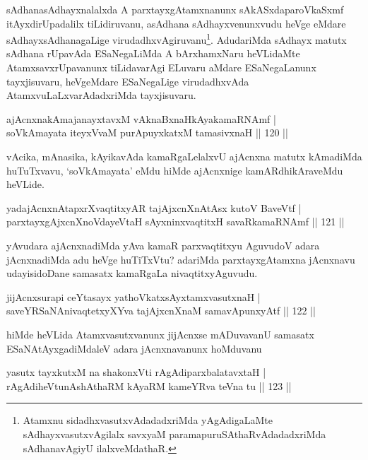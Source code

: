 \begin{artha}
sAdhanasAdhayxnalalxda A parxtayxgAtamxnanunx sAkASxdaparoVkaSxmf itAyxdirUpadalilx tiLidiruvanu, asAdhana sAdhayxvenunxvudu heVge eMdare sAdhayxsAdhanagaLige virudadhxvAgiruvanu\footnote{Atamxnu sidadhxvasutxvAdadadxriMda yAgAdigaLaMte sAdhayxvasutxvAgilalx savxyaM paramapuruSAthaRvAdadadxriMda sAdhanavAgiyU ilalxveMdathaR.}. AdudariMda sAdhayx matutx sAdhana rUpavAda ESaNegaLiMda A bArxhamxNaru heVLidaMte AtamxsavxrUpavanunx tiLidavarAgi ELuvaru aMdare ESaNegaLanunx tayxjisuvaru, heVgeMdare ESaNegaLige virudadhxvAda AtamxvuLaLxvarAdadxriMda tayxjisuvaru.
\end{artha}

\begin{shl}
ajAcnxnakAmajanayxtavxM vAknaBxnaHkAyakamaRNAmf |\\
soV\s kAmayata iteyxVvaM purA\s puyxkatxM tamasivxnaH \hfill || 120 ||
\end{shl}

\begin{artha}%
vAcika, mAnasika, kAyikavAda kamaRgaLelalxvU ajAcnxna matutx kAmadiMda huTuTxvavu, `soV\s kAmayata' eMdu hiMde ajAcnxnige kamARdhikAraveMdu heVLide.
\end{artha}

\begin{shl}
yadajAcnxnAtapxrXvaqtitxyAR tajAjxcnXnAtAsx kutoV BaveVtf |\\
parxtayxgAjxcnXnoVdayeV\s taH sAyxninxvaqtitxH savaRkamaRNAmf \hfill || 121 ||
\end{shl}

\begin{artha}
yAvudara ajAcnxnadiMda yAva kamaR parxvaqtitxyu AguvudoV adara jAcnxnadiMda adu heVge huTiTxVtu? adariMda parxtayxgAtamxna jAcnxnavu udayisidoDane samasatx kamaRgaLa nivaqtitxyAguvudu.
\end{artha}

\begin{shl}
jijAcnxsurapi ceYtasayx yathoVkatxsAyx\s \s tamxvasutxnaH |\\
saveYRSaNAnivaqtetxyXYva tajAjxcnXnaM samavApunxyAtf \hfill || 122 ||
\end{shl}

\begin{artha}
hiMde heVLida Atamxvasutxvanunx jijAcnxse mADuvavanU samasatx ESaNAtAyxgadiMdaleV adara jAcnxnavanunx hoMduvanu
\end{artha}

\begin{shl}
yasutx tayxkutxM na shakonxVti rAgAdiparxbalatavxtaH |\\
rAgAdiheVtunAshAthaRM kAyaRM kameYRva teVna tu \hfill || 123 ||
\end{shl}

